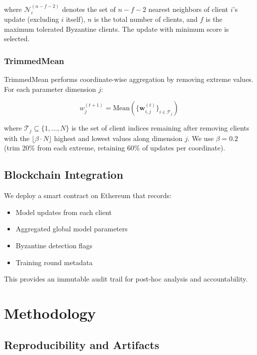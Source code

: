 \documentclass[12pt,a4paper,onecolumn]{article}
\begin{document}
where $\mathcal{N}_i^{(n-f-2)}$ denotes the set of $n-f-2$ nearest neighbors of client $i$'s update (excluding $i$ itself), $n$ is the total number of clients, and $f$ is the maximum tolerated Byzantine clients. The update with minimum score is selected.

\subsubsection{TrimmedMean}

TrimmedMean performs coordinate-wise aggregation by removing extreme values. For each parameter dimension $j$:

\begin{equation}
w_j^{(t+1)} = \text{Mean}\left(\{\mathbf{w}_{i,j}^{(t)}\}_{i \in \mathcal{T}_j}\right)
\label{eq:trimmed_mean}
\end{equation}

where $\mathcal{T}_j \subseteq \{1,\ldots,N\}$ is the set of client indices remaining after removing clients with the $\lfloor\beta \cdot N\rfloor$ highest and lowest values along dimension $j$. We use $\beta = 0.2$ (trim 20\% from each extreme, retaining 60\% of updates per coordinate).

\subsection{Blockchain Integration}

We deploy a smart contract on Ethereum that records:
\begin{itemize}
    \item Model updates from each client
    \item Aggregated global model parameters
    \item Byzantine detection flags
    \item Training round metadata
\end{itemize}

This provides an immutable audit trail for post-hoc analysis and accountability.

\section{Methodology}
\label{sec:methodology}

\subsection{Reproducibility and Artifacts}
\end{document}
